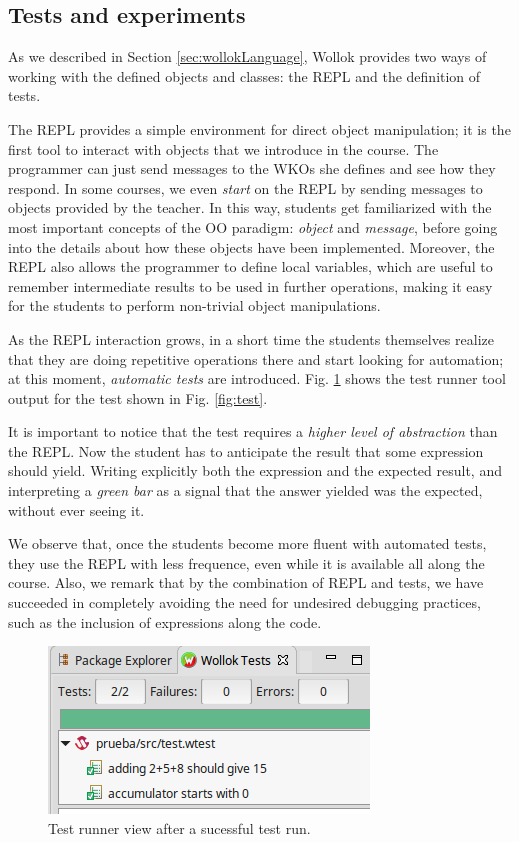 \subsection{Tests and experiments}
As we described in Section \ref{sec:wollokLanguage}, Wollok provides two ways of working with the defined objects and classes: the REPL and the definition of tests.

The REPL provides a simple environment for direct object manipulation; it is the first tool to interact with objects that we introduce in the course.
The programmer can just send messages to the WKOs she defines and see how they respond. 
In some courses, we even \emph{start} on the REPL by sending messages to objects provided by the teacher.
In this way, students get familiarized with the most important concepts of the OO paradigm: \emph{object} and \emph{message}, before going into the details about how these objects have been implemented.
Moreover, the REPL also allows the programmer to define local variables, which are useful to remember intermediate results to be used in further operations, making it easy for the students to perform non-trivial object manipulations.

\medskip
As the REPL interaction grows, in a short time the students themselves realize that they are doing repetitive operations there and start looking for automation;
at this moment, \emph{automatic tests} are introduced.
Fig. \ref{fig:testRunner.png} shows the test runner tool output for the test shown in Fig. \ref{fig:test}.

It is important to notice that the test requires a \emph{higher level of abstraction} than the REPL.
Now the student has to anticipate the result that some expression should yield. Writing explicitly both the expression and the expected result, and interpreting a \emph{green bar} as a signal that the answer yielded was the expected, without ever seeing it.

We observe that, once the students become more fluent with automated tests, they use the REPL with less frequence, even while it is available all along the course.
Also, we remark that by the combination of REPL and tests, we have succeeded in completely avoiding the need for undesired debugging practices, such as the inclusion of  expressions along the code.

\begin{figure}[ht]
    \centering
	\includegraphics[scale=0.6]{images/testRunner.png}
    \caption{Test runner view after a sucessful test run.}
    \label{fig:testRunner.png}
\vspace{-3mm}
\end{figure}


